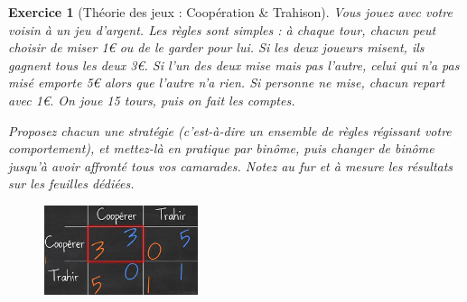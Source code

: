 \documentclass[12pt]{article}
\theoremstyle{break}
\newtheorem{exo}{Exercice}
\begin{document}
\begin{exo}[Théorie des jeux : Coopération \& Trahison]
Vous jouez avec votre voisin à un jeu d'argent. Les règles sont simples : à chaque tour, chacun peut choisir de miser 1€ ou de le garder pour lui. Si les deux joueurs misent, ils gagnent tous les deux 3€. Si l'un des deux mise mais pas l'autre, celui qui n'a pas misé emporte 5€ alors que l'autre n'a rien. Si personne ne mise, chacun repart avec 1€. On joue 15 tours, puis on fait les comptes.

Proposez chacun une stratégie (c'est-à-dire un ensemble de règles régissant votre comportement), et mettez-là en pratique par binôme, puis changer de binôme jusqu'à avoir affronté tous vos camarades. Notez au fur et à mesure les résultats sur les feuilles dédiées.

\begin{figure}[h!]
	\centering
    \includegraphics[width=0.4\textwidth]{CooperationTrahison.jpg}
\end{figure}
\end{exo}
\end{document}

